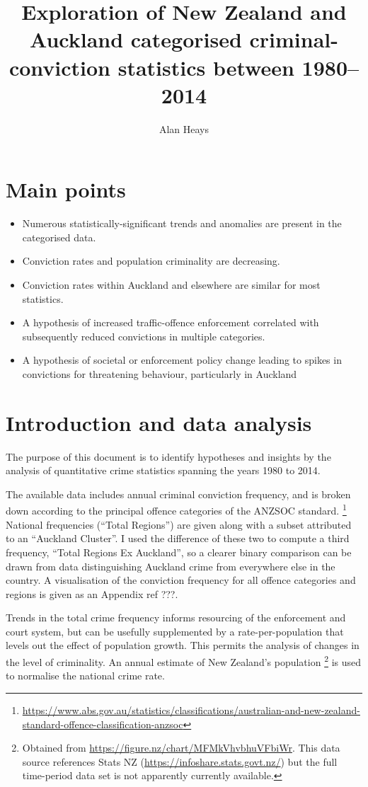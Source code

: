 \documentclass[onecolumn]{mysimple}
\title{Exploration of New Zealand and Auckland categorised criminal-conviction statistics between 1980–2014}
\author{Alan Heays}
\begin{document}
\maketitle

\section*{Main points}
\begin{itemize}
  \item Numerous statistically-significant trends and anomalies are present in the categorised data.
  \item Conviction rates and population criminality are decreasing.
  \item Conviction rates within Auckland and elsewhere are similar for most statistics.
  \item A hypothesis of increased traffic-offence enforcement correlated with subsequently reduced convictions in multiple categories.
  \item A hypothesis of societal or enforcement policy change leading to spikes in convictions for threatening behaviour, particularly in Auckland
\end{itemize}

\section*{Introduction and data analysis}

The purpose of this document is to identify hypotheses and insights by  the analysis of quantitative crime statistics spanning the years 1980 to 2014.

The available data includes annual criminal conviction frequency, and is broken down according to the principal offence categories of the ANZSOC standard. \footnote{\url{https://www.abs.gov.au/statistics/classifications/australian-and-new-zealand-standard-offence-classification-anzsoc}}
National frequencies (``Total Regions'') are given along with a subset attributed to an ``Auckland Cluster''.  
I used the difference of these two to compute a third frequency, ``Total Regions Ex Auckland'', so a clearer binary comparison can be drawn from data distinguishing Auckland crime from everywhere else in the country.
A visualisation of the conviction frequency for all offence categories and regions is given as an Appendix ref ???.

Trends in the total crime frequency informs resourcing of the enforcement and court system, but can be usefully supplemented by a rate-per-population that levels out the effect of population growth.
This permits the analysis of changes in the level of criminality.
An annual estimate of New Zealand's population \footnote{Obtained from \url{https://figure.nz/chart/MFMkVhvbhuVFbiWr}. This data source references Stats NZ (\url{https://infoshare.stats.govt.nz/}) but the full time-period data set is not apparently currently available.}  is used to normalise the national crime rate.
\end{document}
